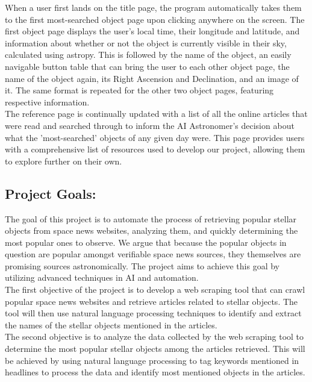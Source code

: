 \documentclass[12pt,letterpaper]{article}
\begin{document}
\quad When a user first lands on the title page, the program automatically takes them to 
the first most-searched object page upon clicking anywhere on the screen. The first object 
page displays the user's local time, their longitude and latitude, and information about 
whether or not the object is currently visible in their sky, calculated using astropy. This 
is followed by the name of the object, an easily navigable button table that can bring the 
user to each other object page, the name of the object again, its Right Ascension and Declination, 
and an image of it. The same format is repeated for the other two object pages, featuring 
respective information. \\

\quad The reference page is continually updated with a list of all the online articles that 
were read and searched through to inform the AI Astronomer's decision about what the 'most-searched' 
objects of any given day were. This page provides users with a comprehensive list of resources 
used to develop our project, allowing them to explore further on their own. \\

\subsection*{Project Goals:}
\quad The goal of this project is to automate the process of retrieving popular stellar objects 
from space news websites, analyzing them, and quickly determining the most popular ones to 
observe. We argue that because the popular objects in question are popular amongst
verifiable space news sources, they themselves are promising sources astronomically. 
The project aims to achieve this goal by utilizing advanced techniques in AI and 
automation.\\

\quad The first objective of the project is to develop a web scraping tool that can 
crawl popular space news websites and retrieve articles related to stellar objects. 
The tool will then use natural language processing techniques to identify and extract 
the names of the stellar objects mentioned in the articles.\\

\quad The second objective is to analyze the data collected by the web scraping tool 
to determine the most popular stellar objects among the articles retrieved. This 
will be achieved by using natural language processing to tag keywords mentioned 
in headlines to process the data and identify most mentioned objects in the articles.\\
\end{document}

